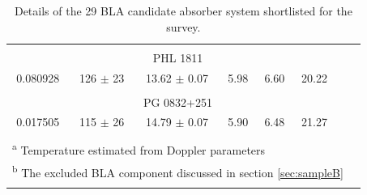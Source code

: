 \begin{longtable}{cccccccc}
            \hline \tabularnewline

            \multicolumn{7}{c}{PHL 1811} \\ \hline 

            0.080928  &  126 $\pm$ 23  &  13.62 $\pm$ 0.07  &  5.98  &  6.60  &  20.22  &   \\

            \hline \tabularnewline

            \multicolumn{7}{c}{PG 0832+251} \\ \hline 

            0.017505  &  115 $\pm$ 26  &  14.79 $\pm$ 0.07  &  5.90  &  6.48  &  21.27  &   \\

            \hline
      
           \tabularnewline \hline \hline 

           \multicolumn{7}{l}{\textsuperscript{a} \footnotesize{Temperature estimated from Doppler parameters}} \\ 
           \multicolumn{7}{l}{\textsuperscript{b} \footnotesize{The excluded BLA component discussed in section \ref{sec:sampleB}}} \\ 

    \caption{Details of the 29 BLA candidate absorber system shortlisted  for the survey.}
    \label{tab:CIE-properties}
\end{longtable}


